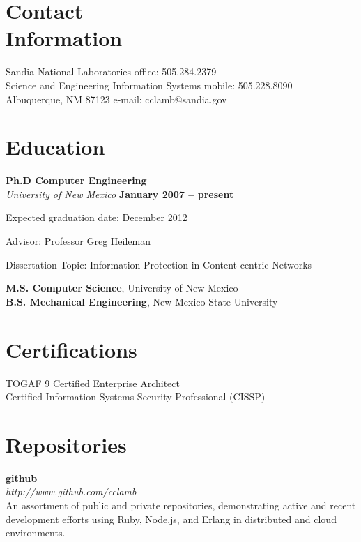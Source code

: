 \documentclass[margin,line]{resume}
\begin{document}
\begin{resume}

\section{\mysidestyle Contact\\Information}
Sandia National Laboratories					\hfill office: 505.284.2379				\vspace{0mm}\\\vspace{0mm}%
Science and Engineering Information Systems	\hfill mobile: 505.228.8090      		\vspace{0mm}\\\vspace{0mm}%
Albuquerque, NM 87123						\hfill e-mail: cclamb@sandia.gov		  	\vspace{0mm}\\\vspace{-4.5mm}%

\section{\mysidestyle Education}

\textbf{Ph.D Computer Engineering} \\
\textsl{University of New Mexico} \hfill \textbf{ January 2007 -- present} \\\vspace{-3mm}%
\begin{list2}
\item Expected graduation date: December 2012
\item Advisor:  Professor Greg Heileman
\item Dissertation Topic: Information Protection in Content-centric Networks
\end{list2}
{\bf M.S. Computer Science}, University of New Mexico \\
{\bf B.S. Mechanical Engineering}, New Mexico State University

\section{\mysidestyle Certifications}
TOGAF 9 Certified Enterprise Architect \\
Certified Information Systems Security Professional (CISSP)

\section{\mysidestyle Repositories}
{\bf github} \vspace{2mm}  \\
{\sl http://www.github.com/cclamb} \vspace{1mm} \\
An assortment of public and private repositories, demonstrating active and recent development efforts using Ruby, Node.js, and Erlang in distributed and cloud environments.


\end{resume}
\end{document}
